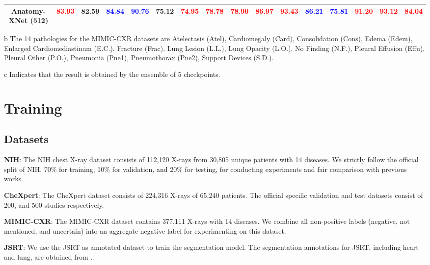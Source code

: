 \documentclass[journal]{IEEEtran}
\begin{document}
\begin{table*}[!t]
\begin{adjustbox}{width=\textwidth}
\begin{threeparttable}[b]
\begin{tabular}{c|cccccccccccccc|c}
    Anatomy-XNet (512) & \textcolor{red}{\bf 83.93} & 82.59 & \textcolor{blue}{\bf 84.84} & \textcolor{blue}{\bf 90.76} & 75.12 & \textcolor{red}{\bf 74.95} & \textcolor{red}{\bf 78.78} & \textcolor{red}{\bf 78.90} & \textcolor{red}{\bf 86.97} & \textcolor{red}{\bf 93.43} & \textcolor{blue}{\bf 86.21} & \textcolor{blue}{\bf 75.81} & \textcolor{red}{\bf 91.20} & \textcolor{red}{\bf 93.12} & \textcolor{red}{\bf 84.04} \\
    
    \bottomrule 
    \end{tabular}
    \begin{tablenotes}
    \item[b] The 14 pathologies for the MIMIC-CXR datasets are Atelectasis (Atel), Cardiomegaly (Card), Consolidation (Cons), Edema (Edem), Enlarged Cardiomediastinum (E.C.), Fracture (Frac), Lung Lesion (L.L.), Lung Opacity (L.O.), No Finding (N.F.), Pleural Effusion (Effu), Pleural Other (P.O.), Pneumonia (Pne1), Pneumothorax (Pne2), Support Devices (S.D.).
    \item[c] Indicates that the result is obtained by the ensemble of 5 checkpoints.
    \end{tablenotes}
    \end{threeparttable}
    \end{adjustbox}
\end{table*}

\section{Training}
\subsection{Datasets}
\textbf{NIH}: The NIH chest X-ray dataset \cite{8099852} consists of 112,120 X-rays from 30,805 unique patients with 14 diseases. We strictly follow the official split of NIH, 70\% for training, 10\% for validation, and 20\% for testing, for conducting experiments and fair comparison with previous works. \par
\textbf{CheXpert}: The CheXpert dataset \cite{irvin2019chexpert} consists of 224,316 X-rays of 65,240 patients. The official specific validation and test datasets consist of 200, and 500 studies respectively. \par 
\textbf{MIMIC-CXR}: The MIMIC-CXR dataset \cite{johnson2019mimiccxrjpg} contains 377,111 X-rays with 14 diseases. We combine all non-positive labels (negative, not mentioned, and uncertain) into an aggregate negative label \cite{SeyyedKalantari2021CheXclusionFG} for experimenting on this dataset. \par
\textbf{JSRT}: We use the JSRT \cite{Shiraishi2000DevelopmentOA} as annotated dataset to train the segmentation model. The segmentation annotations for JSRT, including heart and lung, are obtained from \cite{VANGINNEKEN200619}. 
\end{document}
